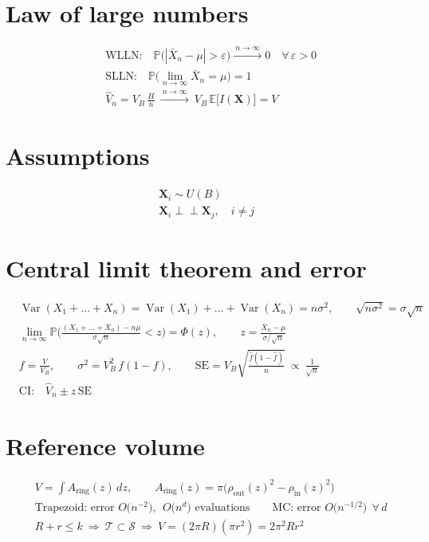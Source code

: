 \documentclass[12pt,a4paper,fleqn]{article}
\numberwithin{equation}{section}
\newcommand{\I}{I}
\newcommand{\E}{\mathbb{E}}
\newcommand{\Prob}{\mathbb{P}}
\newcommand{\Var}{\operatorname{Var}}
\newcommand{\bX}{\mathbf{X}}
\newcommand{\SE}{\mathrm{SE}}
\newcommand{\indep}{\mathrel{\perp\!\!\!\perp}}
\begin{document}
\section{Law of large numbers}
\begin{align}
&\text{WLLN:}\quad \Prob\big(|\bar X_n-\mu|>\varepsilon\big)\xrightarrow{\ n\to\infty\ }0\quad\forall\,\varepsilon>0\\
&\text{SLLN:}\quad \Prob\Big(\lim_{n\to\infty}\bar X_n=\mu\Big)=1\\
&\hat V_n=V_B\,\frac Hn\ \xrightarrow{\ n\to\infty\ }\ V_B\,\E\big[\I(\bX)\big]=V
\end{align}

\section{Assumptions}
\begin{gather}
\bX_i\sim U(B)\tag{A1}\\
\bX_i\indep\bX_j,\quad i\neq j\tag{A2}
\end{gather}

\section{Central limit theorem and error}
\begin{align}
&\Var(X_1+\dots+X_n)=\Var(X_1)+\dots+\Var(X_n)=n\sigma^2,\qquad \sqrt{n\sigma^2}=\sigma\sqrt n\\
&\lim_{n\to\infty}\Prob\bigg(\frac{(X_1+\dots+X_n)-n\mu}{\sigma\sqrt n}<z\bigg)=\Phi(z),\qquad
z=\frac{\bar X_n-\mu}{\sigma/\sqrt n}\\
&f=\frac{V}{V_B},\qquad \sigma^2=V_B^2\,f(1-f),\qquad \SE=V_B\sqrt{\frac{\hat f(1-\hat f)}{n}}\ \propto\ \frac{1}{\sqrt n}\\
&\text{CI:}\quad \hat V_n\pm z\,\SE
\end{align}

\section{Reference volume}
\begin{align}
&V=\int A_{\mathrm{ring}}(z)\,dz,\qquad A_{\mathrm{ring}}(z)=\pi\big(\rho_{\mathrm{out}}(z)^2-\rho_{\mathrm{in}}(z)^2\big)\\
&\text{Trapezoid: error } O\big(n^{-2}\big),\ \ O\big(n^d\big)\text{ evaluations}
\qquad\text{MC: error } O\big(n^{-1/2}\big)\ \ \forall\,d\\
&R+r\le k\ \Rightarrow\ \mathcal T\subset\mathcal S\ \Rightarrow\ V=(2\pi R)(\pi r^2)=2\pi^2Rr^2
\end{align}
\end{document}
